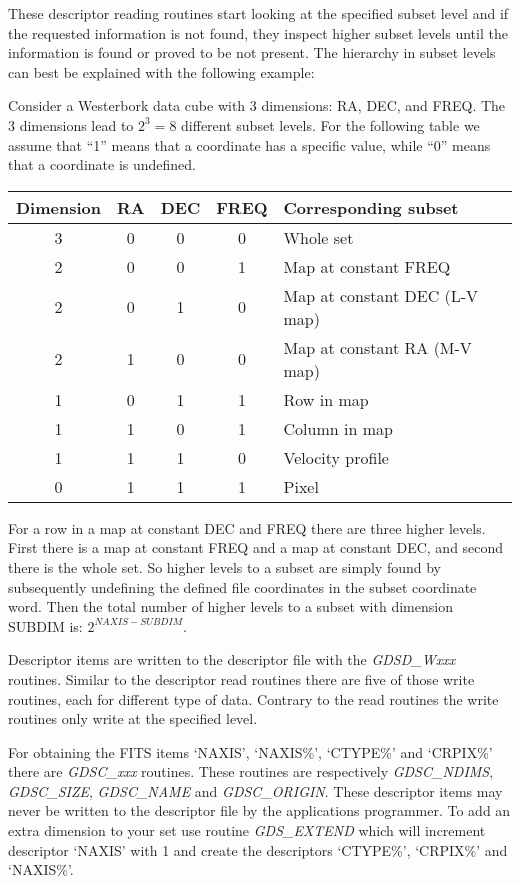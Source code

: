 These descriptor reading routines start looking at the specified subset
level and if the requested information is not found, they inspect higher
subset levels until the information is found or proved to be not
present.  The hierarchy in subset levels can best be explained with the
following example:

Consider a Westerbork data cube with 3 dimensions: RA, DEC, and FREQ.
The 3 dimensions lead to $2^3=8$ different subset levels.  For the
following table we assume that ``1'' means that a coordinate has a
specific value, while ``0'' means that a coordinate is undefined.

\begin{center}
\begin{tabular}{|c|c|c|c|l|}
\hline
Dimension&RA&DEC&FREQ&Corresponding subset\\
\hline
  3   &0&0&0&Whole set\\
  2   &0&0&1&Map at constant FREQ\\
  2   &0&1&0&Map at constant DEC (L-V map)\\
  2   &1&0&0&Map at constant RA (M-V map)\\
  1   &0&1&1&Row in map\\
  1   &1&0&1&Column in map\\
  1   &1&1&0&Velocity profile\\
  0   &1&1&1&Pixel\\
\hline
\end{tabular}
\end{center}

\noindent For a row in a map at constant DEC and FREQ there are three
higher levels. First there is a map at constant FREQ and a map at
constant DEC, and second there is the whole set. So higher levels to a
subset are simply found by subsequently undefining the defined file
coordinates in the subset coordinate word. Then the total number of
higher levels to a subset with dimension SUBDIM is: $2^{NAXIS -
SUBDIM}$.

Descriptor items are written to the descriptor file with the {\sl
GDSD\_Wxxx\/} routines.  Similar to the descriptor read routines there
are five of those write routines, each for different type of data.
Contrary to the read routines the write routines only write at the
specified level.

For obtaining the FITS items `NAXIS', `NAXIS\%', `CTYPE\%' and `CRPIX\%'
there are {\sl GDSC\_xxx\/} routines.  These routines are respectively
{\sl GDSC\_NDIMS\/}, {\sl GDSC\_SIZE\/}, {\sl GDSC\_NAME\/} and {\sl
GDSC\_ORIGIN\/}.  These descriptor items may never be written to the
descriptor file by the applications programmer.  To add an extra
dimension to your set use routine {\sl GDS\_EXTEND\/} which will
increment descriptor `NAXIS' with 1 and create the descriptors
`CTYPE\%', `CRPIX\%' and `NAXIS\%'.

